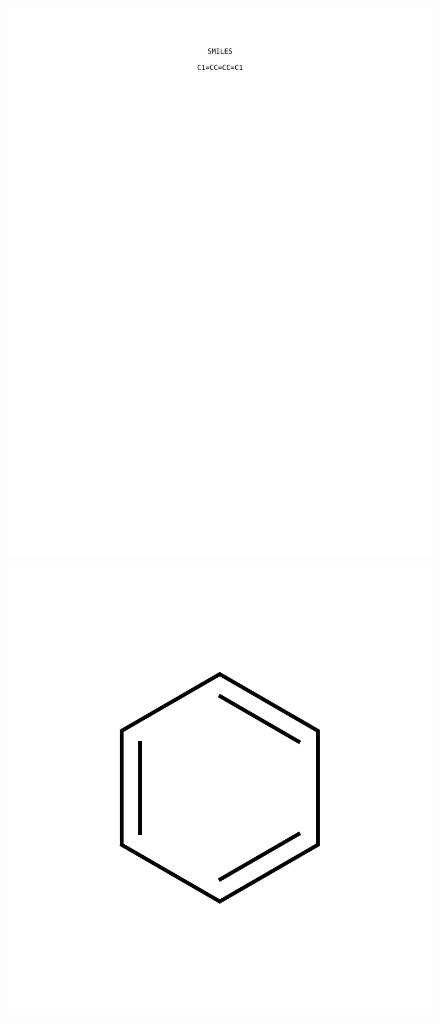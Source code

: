 \begin{figure}[h]
\centering
{\includegraphics[scale=0.8, clip, trim = 95mm 200mm 95mm 20mm]{img/benzene_smiles.pdf}}
{\includegraphics[scale=0.4, clip, trim = 25mm 10mm 25mm 10mm]{img/benzene.pdf}}

\end{figure}
